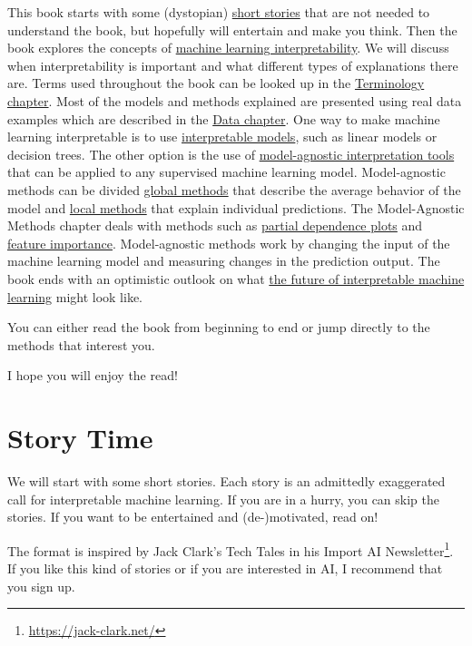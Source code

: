 \documentclass[
  10pt,
]{scrbook}
\renewcommand{\href}[2]{#2\footnote{\url{#1}}}
\begin{document}
This book starts with some (dystopian) \protect\hyperlink{storytime}{short stories} that are not needed to understand the book, but hopefully will entertain and make you think.
Then the book explores the concepts of \protect\hyperlink{interpretability}{machine learning interpretability}.
We will discuss when interpretability is important and what different types of explanations there are.
Terms used throughout the book can be looked up in the \protect\hyperlink{terminology}{Terminology chapter}.
Most of the models and methods explained are presented using real data examples which are described in the \protect\hyperlink{data}{Data chapter}.
One way to make machine learning interpretable is to use \protect\hyperlink{simple}{interpretable models}, such as linear models or decision trees.
The other option is the use of \protect\hyperlink{agnostic}{model-agnostic interpretation tools} that can be applied to any supervised machine learning model.
Model-agnostic methods can be divided \protect\hyperlink{global-methods}{global methods} that describe the average behavior of the model and \protect\hyperlink{local-methods}{local methods} that explain individual predictions.
The Model-Agnostic Methods chapter deals with methods such as \protect\hyperlink{pdp}{partial dependence plots} and \protect\hyperlink{feature-importance}{feature importance}.
Model-agnostic methods work by changing the input of the machine learning model and measuring changes in the prediction output.
The book ends with an optimistic outlook on what \protect\hyperlink{future}{the future of interpretable machine learning} might look like.

You can either read the book from beginning to end or jump directly to the methods that interest you.

I hope you will enjoy the read!

\newpage

\hypertarget{storytime}{%
\section{Story Time}\label{storytime}}

We will start with some short stories.
Each story is an admittedly exaggerated call for interpretable machine learning.
If you are in a hurry, you can skip the stories.
If you want to be entertained and (de-)motivated, read on!

The format is inspired by Jack Clark's Tech Tales in his \href{https://jack-clark.net/}{Import AI Newsletter}.
If you like this kind of stories or if you are interested in AI, I recommend that you sign up.
\end{document}
